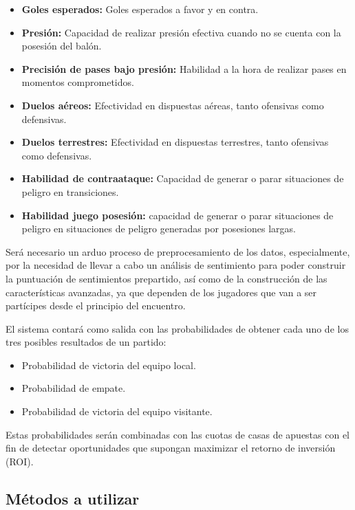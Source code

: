 \begin{enumerate}
    \begin{itemize}
        \item \textbf{Goles esperados:} Goles esperados a favor y en contra.
        \item \textbf{Presión:} Capacidad de realizar presión efectiva cuando no se cuenta con la posesión del balón.
        \item \textbf{Precisión de pases bajo presión:} Habilidad a la hora de realizar pases en momentos comprometidos.
        \item \textbf{Duelos aéreos:} Efectividad en dispuestas aéreas, tanto ofensivas como defensivas.
        \item \textbf{Duelos terrestres:} Efectividad en dispuestas terrestres, tanto ofensivas como defensivas.
        \item \textbf{Habilidad de contraataque:} Capacidad de generar o parar situaciones de peligro en transiciones.
         \item \textbf{Habilidad juego posesión:} capacidad de generar o parar situaciones de peligro en situaciones de peligro generadas por posesiones largas.
    \end{itemize}
\end{enumerate}

Será necesario un arduo proceso de preprocesamiento de los datos, especialmente, por la necesidad de llevar a cabo un análisis de sentimiento para poder construir la puntuación de sentimientos prepartido, así como de la construcción de las características avanzadas, ya que dependen de los jugadores que van a ser partícipes desde el principio del encuentro.

El sistema contará como salida con las probabilidades de obtener cada uno de los tres posibles resultados de un partido:
\begin{itemize}
    \item Probabilidad de victoria del equipo local.
    \item Probabilidad de empate.
    \item Probabilidad de victoria del equipo visitante.
\end{itemize}

Estas probabilidades serán combinadas con las cuotas de casas de apuestas con el fin de detectar oportunidades que supongan maximizar el retorno de inversión (ROI).

\subsection{Métodos a utilizar}

